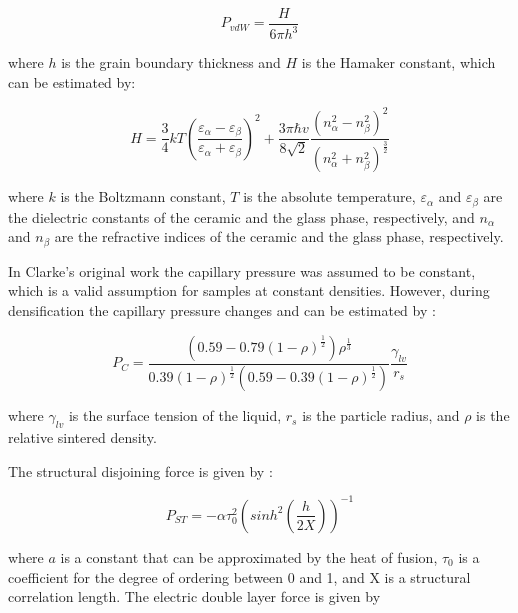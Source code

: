 \begin{equation}
\label{Ch4-eq: eq4}
P_{vdW} = \frac{H}{6 \pi h^{3}}
\end{equation}

\noindent where $h$ is the grain boundary thickness and $H$ is the Hamaker constant, which can be estimated by:

\begin{equation}
\label{Ch4-eq: eq5}
H = \frac{3}{4}kT\left( \frac{\varepsilon_{\alpha} - \varepsilon_{\beta}}{\varepsilon_{\alpha} + \varepsilon_{\beta}} \right)^{2} + \frac{3 \pi \hbar v}{8 \sqrt{2}} \frac{\left( n_{\alpha}^{2} - n_{\beta}^{2} \right)^{2}}{\left( n_{\alpha}^{2} + n_{\beta}^{2} \right)^{\frac{3}{2}}}
\end{equation}

\noindent where $k$ is the Boltzmann constant, $T$ is the absolute temperature, $\varepsilon_{\alpha}$ and $\varepsilon_{\beta}$ are the dielectric constants of the ceramic and the glass phase, respectively, and $n_{\alpha}$ and $n_{\beta}$ are the refractive indices of the ceramic and the glass phase, respectively.

In Clarke's original work the capillary pressure was assumed to be constant, which is a valid assumption for samples at constant densities. However, during densification the capillary pressure changes and can be estimated by \cite{Kwon1991}:

\begin{equation}
\label{Ch4-eq: eq6}
P_{C} = \frac{\left( 0.59-0.79 \left(1-\rho \right)^{\frac{1}{2}} \right) \rho^{\frac{1}{3}}}{0.39 \left(1-\rho \right)^{\frac{1}{2}} \left(0.59-0.39 \left(1-\rho \right)^{\frac{1}{2}} \right)} \frac{\gamma_{lv}}{r_{s}}
\end{equation}

\noindent where $\gamma_{lv}$ is the surface tension of the liquid, $r_{s}$ is the particle radius, and $\rho$ is the relative sintered density.

The structural disjoining force is given by \cite{Clarke1987}:

\begin{equation}
\label{Ch4-eq: eq7}
P_{ST} = - \alpha \tau_{0}^{2} \left( sinh^{2} \left( \frac{h}{2 X} \right) \right)^{-1}
\end{equation}

\noindent where $a$ is a constant that can be approximated by the heat of fusion, $\tau_{0}$ is a coefficient for the degree of ordering between 0 and 1, and X is a structural correlation length.
The electric double layer force is given by \cite{Clarke1993}

